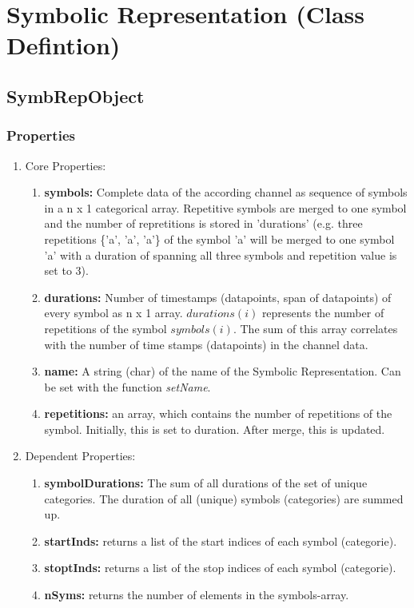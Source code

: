 \documentclass[a4]{scrreprt}
\begin{document}
\section{Symbolic Representation (Class Defintion)}
\label{ChpSymbolicRepresentation}

\subsection{SymbRepObject}
\label{ChpDescriptionSymbRepObject}

\subsubsection{Properties}
\begin{enumerate}
	\item Core Properties:
		\begin{enumerate}
			\item \textbf{symbols:} Complete data of the according channel as sequence of symbols in a n x 1 categorical array. Repetitive symbols are merged to one symbol and the number of repretitions is stored in 'durations' (e.g. three repetitions \{'a', 'a', 'a'\} of the symbol 'a' will be merged to one symbol 'a' with a duration of spanning all three symbols and repetition value is set to 3).
			\item \textbf{durations:} Number of timestamps (datapoints, span of datapoints) of every symbol as n x 1 array. $durations(i)$ represents the number of repetitions of the symbol $symbols(i)$. The sum of this array correlates with the number of time stamps (datapoints) in the channel data.
			\item \textbf{name:} A string (char) of the name of the Symbolic Representation. Can be set with the function \textit{setName}.
			\item \textbf{repetitions:} an array, which contains the number of repetitions of the symbol. Initially, this is set to duration. After merge, this is updated.
		\end{enumerate}
	\item Dependent Properties:
		\begin{enumerate}
			\item \textbf{symbolDurations:} The sum of all durations of the set of unique categories. The duration of all (unique) symbols (categories) are summed up.
			\item \textbf{startInds:} returns a list of the start indices of each symbol (categorie).
			\item \textbf{stoptInds:} returns a list of the stop indices of each symbol (categorie).
			\item \textbf{nSyms:} returns the number of elements in the symbols-array.
		\end{enumerate}
	
	
\end{enumerate}
\end{document}

